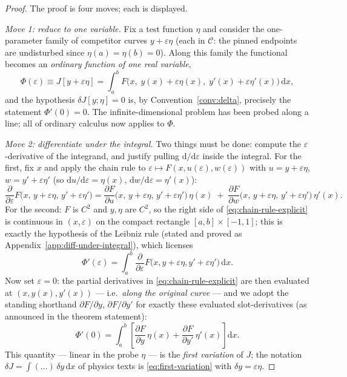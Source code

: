 \documentclass[11pt]{article}
\theoremstyle{plain}
\theoremstyle{definition}
\theoremstyle{remark}
\newcommand{\dd}{\mathrm{d}}
\newcommand{\pd}[2]{\frac{\partial #1}{\partial #2}}
\begin{document}
\begin{proof}
The proof is four moves; each is displayed.

\emph{Move 1: reduce to one variable.}
Fix a test function $\eta$ and consider the one-parameter family of
competitor curves $y + \varepsilon\eta$ (each in $\mathcal C$: the pinned
endpoints are undisturbed since $\eta(a)=\eta(b)=0$). Along this family the
functional becomes an \emph{ordinary function of one real variable},
\begin{equation}
  \Phi(\varepsilon)
  \equiv J[y + \varepsilon \eta]
  = \int_a^b F\bigl(x,\; y(x) + \varepsilon\eta(x),\;
    y'(x) + \varepsilon\eta'(x)\bigr)\,\dd x ,
\end{equation}
and the hypothesis $\delta J[y;\eta] = 0$ is, by
Convention~\ref{conv:delta}, precisely the statement $\Phi'(0) = 0$. The
infinite-dimensional problem has been probed along a line; all of ordinary
calculus now applies to $\Phi$.

\emph{Move 2: differentiate under the integral.}
Two things must be done: compute the $\varepsilon$-derivative of the
integrand, and justify pulling $\dd/\dd\varepsilon$ inside the integral.
For the first, fix $x$ and apply the chain rule to
$\varepsilon \mapsto F(x, u(\varepsilon), w(\varepsilon))$ with
$u = y + \varepsilon\eta$, $w = y' + \varepsilon\eta'$ (so
$\dd u/\dd\varepsilon = \eta(x)$, $\dd w/\dd\varepsilon = \eta'(x)$):
\begin{equation}
  \frac{\partial}{\partial\varepsilon}
  F\bigl(x,\, y + \varepsilon\eta,\, y' + \varepsilon\eta'\bigr)
  = \pd{F}{u}\bigl(x,\, y+\varepsilon\eta,\, y'+\varepsilon\eta'\bigr)\,
    \eta(x)
  \;+\;
  \pd{F}{w}\bigl(x,\, y+\varepsilon\eta,\, y'+\varepsilon\eta'\bigr)\,
    \eta'(x) .
  \label{eq:chain-rule-explicit}
\end{equation}
For the second: $F$ is $C^2$ and $y, \eta$ are $C^2$, so the right side of
\eqref{eq:chain-rule-explicit} is continuous in $(x, \varepsilon)$ on the
compact rectangle $[a,b]\times[-1,1]$; this is exactly the hypothesis of
the Leibniz rule (stated and proved as
Appendix~\ref{app:diff-under-integral}), which licenses
\begin{equation}
  \Phi'(\varepsilon)
  = \int_a^b \frac{\partial}{\partial\varepsilon}
  F\bigl(x, y+\varepsilon\eta, y'+\varepsilon\eta'\bigr)\,\dd x .
\end{equation}
Now set $\varepsilon = 0$: the partial derivatives in
\eqref{eq:chain-rule-explicit} are then evaluated at
$(x, y(x), y'(x))$ --- i.e.\ \emph{along the original curve} --- and we
adopt the standing shorthand $\partial F/\partial y$,
$\partial F/\partial y'$ for exactly these evaluated slot-derivatives
(as announced in the theorem statement):
\begin{equation}
  \Phi'(0)
  = \int_a^b \left[\pd{F}{y}\,\eta(x) + \pd{F}{y'}\,\eta'(x)\right] \dd x .
  \label{eq:first-variation}
\end{equation}
This quantity --- linear in the probe $\eta$ --- is the \emph{first
variation} of $J$; the notation $\delta J = \int(\ldots)\,\delta y\,\dd x$
of physics texts is \eqref{eq:first-variation} with
$\delta y = \varepsilon\eta$.


\end{proof}
\end{document}
